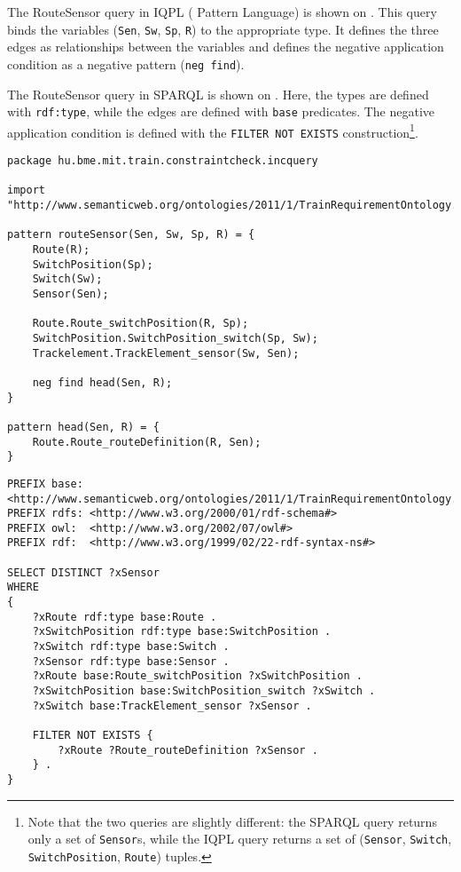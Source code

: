 The RouteSensor query in IQPL (\iq{} Pattern Language) %
is shown on . This query binds the variables (\texttt{Sen}, \texttt{Sw}, \texttt{Sp}, \texttt{R}) to the appropriate type. It defines the three edges as relationships between the variables and defines the negative application condition as a negative pattern (\texttt{neg find}).

The RouteSensor query in SPARQL is shown on . Here, the types are defined with \texttt{rdf:type}, while the edges are defined with \texttt{base} predicates. The negative application condition is defined with the \texttt{FILTER NOT EXISTS} construction\footnote{Note that the two queries are slightly different: the SPARQL query returns only a set of \texttt{Sensor}s, while the IQPL query returns a set of (\texttt{Sensor}, \texttt{Switch}, \texttt{SwitchPosition}, \texttt{Route}) tuples.}.

\lstset{language=viatra}

\begin{lstlisting}[caption=The RouteSensor query in IQPL, label=lst:routesensor-iqpl]
package hu.bme.mit.train.constraintcheck.incquery

import "http://www.semanticweb.org/ontologies/2011/1/TrainRequirementOntology.owl" 

pattern routeSensor(Sen, Sw, Sp, R) = {
	Route(R);
	SwitchPosition(Sp);
	Switch(Sw);
	Sensor(Sen);
	
	Route.Route_switchPosition(R, Sp);
	SwitchPosition.SwitchPosition_switch(Sp, Sw);
	Trackelement.TrackElement_sensor(Sw, Sen);
	
	neg find head(Sen, R);	
}

pattern head(Sen, R) = {
	Route.Route_routeDefinition(R, Sen);
}
\end{lstlisting}



\begin{lstlisting}[caption=The RouteSensor query in SPARQL, label=lst:routesensor-sparql]
PREFIX base: <http://www.semanticweb.org/ontologies/2011/1/TrainRequirementOntology.owl#>
PREFIX rdfs: <http://www.w3.org/2000/01/rdf-schema#>
PREFIX owl:  <http://www.w3.org/2002/07/owl#>
PREFIX rdf:  <http://www.w3.org/1999/02/22-rdf-syntax-ns#>

SELECT DISTINCT ?xSensor
WHERE
{
    ?xRoute rdf:type base:Route .
    ?xSwitchPosition rdf:type base:SwitchPosition .
    ?xSwitch rdf:type base:Switch .
    ?xSensor rdf:type base:Sensor .
    ?xRoute base:Route_switchPosition ?xSwitchPosition .
    ?xSwitchPosition base:SwitchPosition_switch ?xSwitch .
    ?xSwitch base:TrackElement_sensor ?xSensor .

    FILTER NOT EXISTS {
        ?xRoute ?Route_routeDefinition ?xSensor .
    } .
}
\end{lstlisting}


